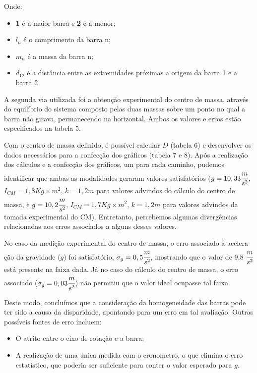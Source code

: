 \documentclass{article}
\begin{document}
Onde: 
\begin{itemize} 
	\item \textbf{1} é a maior barra e \textbf{2} é a menor;
	\item $l_n$ é o comprimento da barra n;
	\item $m_n$ é a massa da barra n;
	\item $d_{12}$ é a distância entre as extremidades próximas a origem da barra 1 e a barra 2
\end {itemize}

A segunda via utilizada foi a obtenção experimental do centro de massa, através do equilíbrio do sistema composto pelas duas massas sobre um ponto no qual a barra não girava, permanecendo na horizontal. Ambos os valores e erros estão especificados na tabela 5.

Com o centro de massa definido, é possível calcular $D$ (tabela 6) e desenvolver os dados necessários para a confecção dos gráficos (tabela 7 e 8). Após a realização dos cálculos e a confecção dos gráficos, um para cada caminho, pudemos identificar que ambas as modalidades geraram valores satisfatórios ($g = 10,33 \cfrac{m}{s^2}$, $I_{CM} = 1,8 Kg\times m^2$, $k = 1,2 m$ para valores advindos do cálculo do centro de massa, e $g = 10,2 \cfrac{m}{s^2}$, $I_{CM} = 1,7 Kg\times m^2$, $k = 1,2 m$ para valores advindos da tomada experimental do CM). Entretanto, percebemos algumas divergências relacionadas aos erros associados a alguns desses valores. 

No caso da medição experimental do centro de massa, o erro associado à acelera-ção da gravidade ($g$) foi satisfatório, $\sigma_g = 0,5 \cfrac{m}{s^2}$, mostrando que o valor de 9,8 $\cfrac{m}{s^2}$ está presente na faixa dada. Já no caso do cálculo do centro de massa, o erro associado ($\sigma_g = 0,03 \cfrac{m}{s^2}$) não permitiu que o valor ideal ocupasse tal faixa.

Deste modo, concluímos que a consideração da homogeneidade das barras pode ter sido a causa da disparidade, apontando para um erro em tal avaliação.
Outras possíveis fontes de erro incluem: 

\begin{itemize} 
	\item O atrito entre o eixo de rotação e a barra;
	\item A realização de uma única medida com o cronometro, o que elimina o erro estatístico, que poderia ser suficiente para conter o valor esperado para $g$.
\end {itemize}
\end{document}
